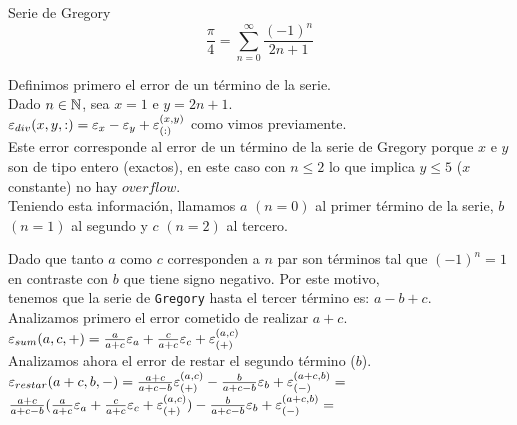 \begin{subsubsection}{Serie de Gregory}
		\begin{equation*}
		\frac{\pi}{4} = \sum_{n=0}^{\infty} \frac{\left(-1\right)^n}{2n+1}
		\end{equation*}

	\pa
	
	Definimos primero el error de un término de la serie.\\
		
	Dado $n \in \mathbb{N}$, sea $x=1$ e $y=2n+1$.\\
		
	$\varepsilon _{div}({x,y,:}) = \varepsilon _{x} - \varepsilon _{y} + \varepsilon _{({:})}^{({x,y})}$ como vimos previamente.\\
	
	Este error corresponde al error de un término de la serie de Gregory porque $x$ e $y$ son de tipo entero (exactos), en este caso con $n \leq 2$ lo que implica $y \leq 5$ ($x$ constante) no hay $overflow$.\\
	
	
	Teniendo esta información, llamamos $a$ $(n=0)$ al primer término de la serie, $b$ $(n=1)$ al segundo y $c$ $(n=2)$ al tercero.
	
	Dado que tanto $a$ como $c$ corresponden a $n$ par son términos tal que $(-1)^n = 1$ en contraste con $b$ que tiene signo negativo. Por este motivo,\\
	tenemos que la serie de \texttt{Gregory} hasta el tercer término es: $a - b + c$.\\
	
	Analizamos primero el error cometido de realizar $a+c$.\\
	
	$\varepsilon _{sum}({a,c,+}) = \frac{a}{a+c}\varepsilon _{a} + \frac{c}{a+c}\varepsilon _{c} + \varepsilon _{({+})}^{({a,c})}$\\
	
	Analizamos ahora el error de restar el segundo término ($b$).\\
		
	$\varepsilon _{restar}({a+c,b,-}) = \frac{a+c}{a+c-b}\varepsilon _{({+})}^{({a,c})} - \frac{b}{a+c-b}\varepsilon _{b} + \varepsilon _{({-})}^{({a+c,b})} =$\\
	
	$\frac{a+c}{a+c-b}(\frac{a}{a+c}\varepsilon _{a} + \frac{c}{a+c}\varepsilon _{c} + \varepsilon _{({+})}^{({a,c})}) - \frac{b}{a+c-b}\varepsilon _{b} + \varepsilon _{({-})}^{({a+c,b})} =$\\
	

\end{subsubsection}
